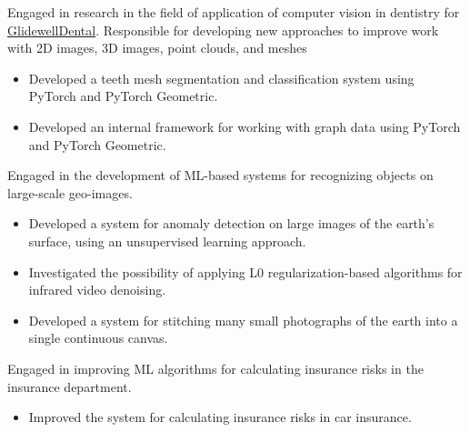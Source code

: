 

Engaged in research in the field of application of computer vision in dentistry for \href{https://glidewelldental.com/}{GlidewellDental}. Responsible for developing new approaches to improve work with 2D images, 3D images, point clouds, and meshes

\begin{itemize}
	\item Developed a teeth mesh segmentation and classification system using PyTorch and PyTorch Geometric.
	\item Developed an internal framework for working with graph data using PyTorch and PyTorch Geometric.
\end{itemize}

\divider



Engaged in the development of ML-based systems for recognizing objects on large-scale geo-images.

\begin{itemize}
	\item Developed a system for anomaly detection on large images of the earth's surface, using an unsupervised learning approach.
	\item Investigated the possibility of applying L0 regularization-based algorithms for infrared video denoising.
	\item Developed a system for stitching many small photographs of the earth into a single continuous canvas.
\end{itemize}

\divider



Engaged in improving ML algorithms for calculating insurance risks in the insurance department.

\begin{itemize}
	\item Improved the system for calculating insurance risks in car insurance.
\end{itemize}


